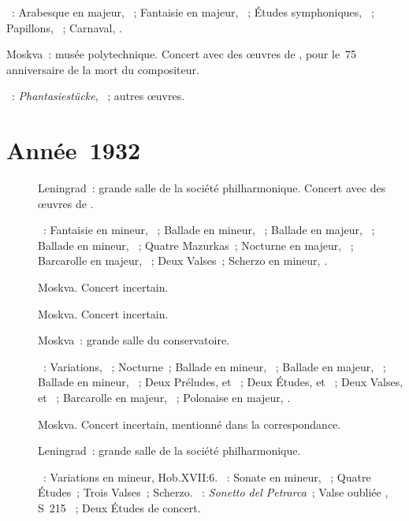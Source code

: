 \begin{description}
 \textsc{\Schumann{}}~: Arabesque en \kC majeur, ~; Fantaisie en
 \kC majeur, ~; Études symphoniques, ~; Papillons,
 ~; Carnaval, .
 \item[\DateWithWeekDay{1931-12-25}]
 Moskva~: musée polytechnique.
 Concert avec des œuvres de \Schumann{}, pour le~75\ieme{} anniversaire de
 la mort du compositeur.

 \textsc{\Schumann{}}~: \emph{Phantasiestücke}, ~; autres œuvres.
\end{description}

\section{Année~1932}

\begin{description}
 \item[]
 Leningrad~: grande salle de la société philharmonique.
 Concert avec des œuvres de \Chopin{}.

 \textsc{\Chopin{}}~: Fantaisie en \kF mineur, ~; Ballade en \kF
 mineur, ~; Ballade en \kA \Flat majeur, ~; Ballade en \kG
 mineur, ~; Quatre Mazurkas~; Nocturne en \kF \Sharp majeur,
  ~; Barcarolle en \kF \Sharp majeur, ~; Deux
 Valses~; Scherzo en \kB mineur, .
 \item[]
 Moskva.
 Concert incertain.
 \item[]
 Moskva.
 Concert incertain.
 \item[]
 Moskva~: grande salle du conservatoire.

 \textsc{\Chopin{}}~: Variations, ~; Nocturne~; Ballade en \kG
 mineur, ~; Ballade en \kA \Flat majeur, ~; Ballade en \kF
 mineur, ~; Deux Préludes,   et ~;
 Deux Études,   et  ~; Deux Valses,
   et  ~; Barcarolle en \kF \Sharp
 majeur, ~; Polonaise en \kA \Flat majeur, .
 \item[]
 Moskva.
 Concert incertain, mentionné dans la correspondance.
 \item[]
 Leningrad~: grande salle de la société philharmonique.

 \textsc{\Haydn{}}~: Variations en \kF mineur, Hob.XVII:6.
 \textsc{\Chopin{}}~: Sonate en \kB \Flat mineur, ~; Quatre
 Études~; Trois Valses~; Scherzo.
 \textsc{\Liszt{}}~: \emph{Sonetto del Petrarca}~; Valse oubliée ,
 S~215 ~; Deux Études de concert.


\end{description}
